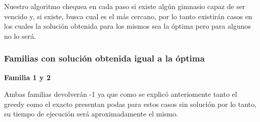 Nuestro algoritmo chequea en cada paso si existe alg\'un gimnasio capaz de ser vencido y, si existe, busca cual es el m\'as cercano, por lo tanto existir\'an casos en los cuales la soluci\'on obtenida para los mismos sea la \'optima pero para algunos no lo ser\'a.

\subsubsection*{Familias con soluci\'on obtenida igual a la \'optima}


\begin{center}
\textbf{Familia 1 y 2}
\end{center}

Ambas familias devolverán -1 ya que como se explicó anteriomente tanto el greedy como el exacto presentan podas para estos casos sin soluci\'on por lo tanto, su tiempo de ejecuci\'on ser\'a aproximadamente el mismo. \\\\

\begin{figure}[h]
 \centering
       \label{fig:fam1medicion}
    \label{fig:fam2medicion}
    \end{figure}

